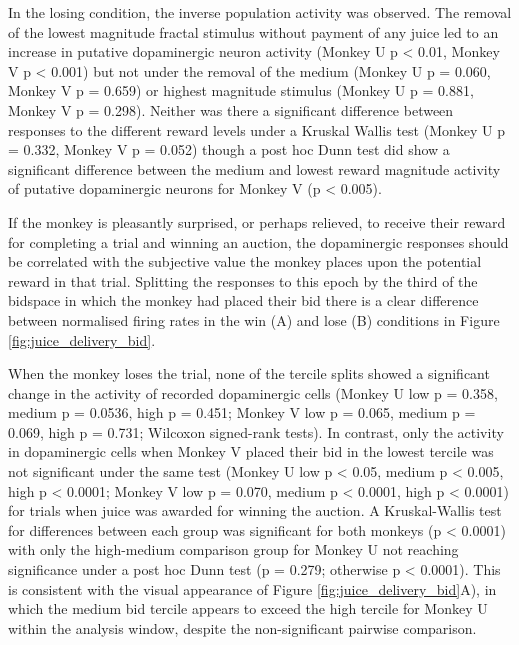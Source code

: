In the losing condition, the inverse population activity was observed. The removal of the lowest magnitude fractal stimulus without payment of any juice led to an increase in putative dopaminergic neuron activity (Monkey U p < 0.01, Monkey V p < 0.001) but not under the removal of the medium (Monkey U p = 0.060, Monkey V p = 0.659) or highest magnitude stimulus (Monkey U p = 0.881, Monkey V p = 0.298). Neither was there a significant difference between responses to the different reward levels under a Kruskal Wallis test (Monkey U p = 0.332, Monkey V p = 0.052) though a post hoc Dunn test did show a significant difference between the medium and lowest reward magnitude activity of putative dopaminergic neurons for Monkey V (p < 0.005).

If the monkey is pleasantly surprised, or perhaps relieved, to receive their reward for completing a trial and winning an auction, the dopaminergic responses should be correlated with the subjective value the monkey places upon the potential reward in that trial. Splitting the responses to this epoch by the third of the bidspace in which the monkey had placed their bid there is a clear difference between normalised firing rates in the win (A) and lose (B) conditions in Figure \ref{fig:juice_delivery_bid}.

When the monkey loses the trial, none of the tercile splits showed a significant change in the activity of recorded dopaminergic cells (Monkey U low p = 0.358, medium p = 0.0536, high p = 0.451; Monkey V low p = 0.065, medium p = 0.069, high p = 0.731; Wilcoxon signed-rank tests). In contrast, only the activity in dopaminergic cells when Monkey V placed their bid in the lowest tercile was not significant under the same test (Monkey U low p < 0.05, medium p < 0.005, high p < 0.0001; Monkey V low p = 0.070, medium p < 0.0001, high p < 0.0001) for trials when juice was awarded for winning the auction. A Kruskal-Wallis test for differences between each group was significant for both monkeys (p < 0.0001) with only the high-medium comparison group for Monkey U not reaching significance under a post hoc Dunn test (p = 0.279; otherwise p < 0.0001). This is consistent with the visual appearance of Figure \ref{fig:juice_delivery_bid}A), in which the medium bid tercile appears to exceed the high tercile for Monkey U within the analysis window, despite the non-significant pairwise comparison.

